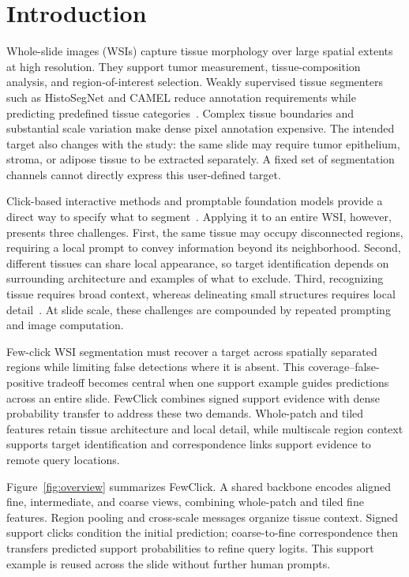 \section{Introduction}
Whole-slide images (WSIs) capture tissue morphology over large spatial extents at high resolution. They support tumor measurement, tissue-composition analysis, and region-of-interest selection. Weakly supervised tissue segmenters such as HistoSegNet and CAMEL reduce annotation requirements while predicting predefined tissue categories~\cite{chan2019histosegnet,xu2019camel}. Complex tissue boundaries and substantial scale variation make dense pixel annotation expensive. The intended target also changes with the study: the same slide may require tumor epithelium, stroma, or adipose tissue to be extracted separately. A fixed set of segmentation channels cannot directly express this user-defined target.

Click-based interactive methods and promptable foundation models provide a direct way to specify what to segment~\cite{sofiiuk2022ritm,liu2023simpleclick,kirillov2023sam}. Applying it to an entire WSI, however, presents three challenges. First, the same tissue may occupy disconnected regions, requiring a local prompt to convey information beyond its neighborhood. Second, different tissues can share local appearance, so target identification depends on surrounding architecture and examples of what to exclude. Third, recognizing tissue requires broad context, whereas delineating small structures requires local detail~\cite{tokunaga2019awmf,vanrijthoven2021hooknet,ho2021dmmn}. At slide scale, these challenges are compounded by repeated prompting and image computation.

Few-click WSI segmentation must recover a target across spatially separated regions while limiting false detections where it is absent. This coverage--false-positive tradeoff becomes central when one support example guides predictions across an entire slide. FewClick combines signed support evidence with dense probability transfer to address these two demands. Whole-patch and tiled features retain tissue architecture and local detail, while multiscale region context supports target identification and correspondence links support evidence to remote query locations.

Figure~\ref{fig:overview} summarizes FewClick. A shared backbone encodes aligned fine, intermediate, and coarse views, combining whole-patch and tiled fine features. Region pooling and cross-scale messages organize tissue context. Signed support clicks condition the initial prediction; coarse-to-fine correspondence then transfers predicted support probabilities to refine query logits. This support example is reused across the slide without further human prompts.

